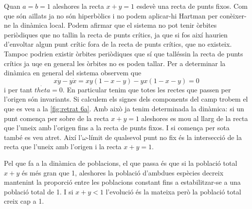 \documentclass[12pt]{article}
\numberwithin{table}{section}
\numberwithin{equation}{section}
\numberwithin{figure}{section}
\begin{document}
Quan \( a = b = 1 \) aleshores la recta \( x + y = 1 \) esdevè una recta de punts fixos. Com que són aïllats ja no són hiperbòlics i no podem aplicar-hi Hartman per conèixer-ne la dinàmica local. Podem afirmar que el sistema no pot tenir òrbites periòdiques que no tallin la recta de punts crítics, ja que si fos així haurien d'envoltar algun punt crític fora de la recta de punts crítics, que no existeix. Tampoc podrien existir òrbites periòdiques que sí que talléssin la recta de punts crítics ja uqe en general les òrbites no es poden tallar. Per a determinar la dinàmica en general del sistema observem que 
\begin{equation*}
	x\dot{y} - y\dot{x} = xy(1 - x - y) - yx(1 - x - y) = 0
\end{equation*}
i per tant \( \dot{theta} = 0 \). En particular tenim que totes les rectes que passen per l'origen són invariants. Si calculem els signes dels components del camp trobem el que es veu a la \cref{fig:retrat 6a}. Amb això ja tenim determinada la dinàmica: si un punt comença per sobre de la recta \( x + y = 1 \) aleshores es mou al llarg de la recta que l'uneix amb l'origen fins a la recta de punts fixos. I si comença per sota també es veu atret. Així l'\( \omega \)-límit de qualsevol punt no fix és la intersecció de la recta que l'uneix amb l'origen i la recta \( x+y = 1 \).  

Pel que fa a la dinàmica de poblacions, el que passa és que si la població total \( x + y \) és més gran que 1, aleshores la població d'ambdues espècies decreix mantenint la proporció entre les poblacions constant fins a estabilitzar-se a una població total de 1. I si \( x+y < 1 \) l'evolució és la mateixa però la població total creix cap a 1. 
\end{document}
